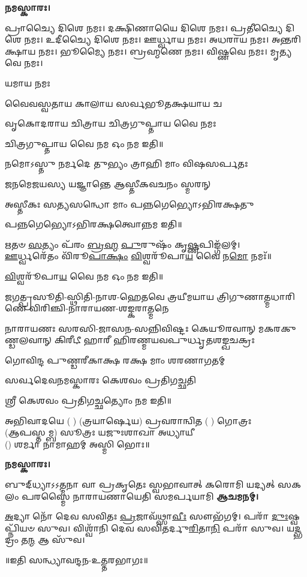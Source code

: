\textbf{𑌨𑌮𑌸𑍍𑌕𑌾𑌰𑌃।}


𑌪𑍍𑌰𑌾𑌚𑍍𑌯𑍈 𑌦𑌿𑌶𑍇 𑌨𑌮𑌃।   
𑌦𑌕𑍍𑌷𑌿𑌣𑌾𑌯𑍈 𑌦𑌿𑌶𑍇 𑌨𑌮𑌃।  
𑌪𑍍𑌰𑌤𑍀𑌚𑍍𑌯𑍈 𑌦𑌿𑌶𑍇 𑌨𑌮𑌃।   
𑌉𑌦𑍀𑌚𑍍𑌯𑍈 𑌦𑌿𑌶𑍇 𑌨𑌮𑌃।   
𑌊𑌰𑍍𑌧𑍍𑌵𑌾𑌯 𑌨𑌮𑌃।   
𑌅𑌧𑌰𑌾𑌯 𑌨𑌮𑌃।   
𑌅𑌨𑍍𑌤𑌰𑌿𑌕𑍍𑌷𑌾𑌯 𑌨𑌮𑌃। 
𑌭𑍂𑌮𑍍𑌯𑍈 𑌨𑌮𑌃। 
𑌬𑍍𑌰𑌹𑍍𑌮𑌣𑍇 𑌨𑌮𑌃। 
𑌵𑌿𑌷𑍍𑌣𑌵𑍇 𑌨𑌮𑌃।  
𑌮𑍃𑌤𑍍𑌯𑌵𑍇 𑌨𑌮𑌃।

𑌯𑌮𑌾𑌯 𑌨𑌮𑌃   

{𑌵𑍈𑌵𑌸𑍍𑌵𑌤𑌾𑌯   𑌕𑌾𑌲𑌾𑌯   𑌸𑌰𑍍𑌵𑌭𑍂𑌤𑌕𑍍𑌷𑌯𑌾𑌯   𑌚}

{𑌵𑍃𑌕𑍋𑌦𑌰𑌾𑌯   𑌚𑌿𑌤𑍍𑌰𑌾𑌯   𑌚𑌿𑌤𑍍𑌰𑌗𑍁𑌪𑍍𑌤𑌾𑌯   𑌵𑍈  𑌨𑌮𑌃}

𑌚𑌿𑌤𑍍𑌰𑌗𑍁𑌪𑍍𑌤𑌾𑌯   𑌵𑍈  𑌨𑌮 𑌓𑌂 𑌨𑌮 𑌇𑌤𑌿॥

 
{𑌨𑌮𑍋𑌽𑌸𑍍𑌤𑍁 𑌨𑌰𑍍𑌮𑌦𑍇 𑌤𑍁𑌭𑍍𑌯𑌂 𑌤𑍍𑌰𑌾𑌹𑌿 𑌮𑌾𑌂 𑌵𑌿𑌷𑌸𑌰𑍍𑌪𑌤𑌃}

{𑌜𑌨𑌮𑍇𑌜𑌯𑌸𑍍𑌯 𑌯𑌜𑍍𑌞𑌾𑌨𑍍𑌤𑍇 𑌆𑌸𑍍𑌤𑍀𑌕𑌵𑌚𑌨𑌂 𑌸𑍍𑌮𑌰𑌨𑍍}


{𑌅𑌸𑍍𑌤𑍀𑌕𑌃 𑌸𑌤𑍍𑌯𑌸𑌨𑍍𑌧𑍋 𑌮𑌾𑌂 𑌪𑌨𑍍𑌨𑌗𑍇𑌭𑍍𑌯𑍋𑌽𑌭𑌿𑌰𑌕𑍍𑌷𑌤𑍁}

𑌪𑌨𑍍𑌨𑌗𑍇𑌭𑍍𑌯𑍋𑌽𑌭𑌿𑌰𑌕𑍍𑌷𑌤𑍍𑌵𑍋𑌨𑍍𑌨𑌮 𑌇𑌤𑌿॥

 

\-\ul{𑌋}\-𑌤𑍞 \ul{𑌸}\-𑌤𑍍𑌯𑌂 𑌪᳴𑌰𑌂 \ul{𑌬𑍍𑌰}\-\-\ul{𑌹𑍍𑌮} \ul{𑌪𑍁}\-𑌰𑍁𑌷𑌂᳴ 𑌕𑍃\-\ul{𑌷𑍍𑌣}\-𑌪𑌿𑌙𑍍𑌗᳴𑌲𑌮𑍍।\\
\-\ul{𑌊}\-𑌰𑍍𑌧𑍍𑌵𑌰𑍇᳴𑌤𑌂 𑌵𑌿᳴𑌰𑍂\-\ul{𑌪𑌾}\-\-\ul{𑌕𑍍𑌷𑌂} \ul{𑌵𑌿}\-𑌶𑍍𑌵𑌰𑍂᳴𑌪𑌾\-\ul{𑌯} 𑌵𑍈 𑌨\-\ul{𑌮𑍋} 𑌨𑌮𑌃᳴॥


\-\ul{𑌵𑌿}\-𑌶𑍍𑌵𑌰𑍂᳴𑌪𑌾\-\ul{𑌯} 𑌵𑍈 𑌨𑌮 𑌓𑌂 𑌨𑌮 𑌇𑌤𑌿॥


{𑌜𑌗𑌤𑍍𑌪𑍍𑌰𑌸𑍂𑌤𑌿-𑌸𑍍𑌥𑌿𑌤𑌿-𑌨𑌾𑌶-𑌹𑍇𑌤𑌵𑍇}
{𑌤𑍍𑌰𑌯𑍀𑌮𑌯𑌾𑌯 𑌤𑍍𑌰𑌿𑌗𑍁𑌣𑌾𑌤𑍍𑌮𑌧𑌾𑌰𑌿𑌣𑍇}
{𑌵𑌿𑌰𑌿𑌞𑍍𑌚𑌿-𑌨𑌾𑌰𑌾𑌯𑌣-𑌶𑌙𑍍𑌕𑌰𑌾𑌤𑍍𑌮𑌨𑍇}

{𑌨𑌾𑌰𑌾𑌯𑌣𑌃 𑌸𑌰𑌸𑌿-𑌜𑌾𑌸𑌨-𑌸𑌨𑍍𑌨𑌿𑌵𑌿𑌷𑍍𑌟𑌃}
{𑌕𑍇𑌯𑍂𑌰𑌵𑌾𑌨𑍍 𑌮𑌕𑌰𑌕𑍁𑌣𑍍𑌡𑌲𑌵𑌾𑌨𑍍 𑌕𑌿𑌰𑍀𑌟𑍀}
{𑌹𑌾𑌰𑍀 𑌹𑌿𑌰𑌣𑍍𑌮𑌯𑌵𑌪𑍁𑌰𑍍𑌧𑍃𑌤𑌶𑌙𑍍𑌖𑌚𑌕𑍍𑌰𑌃}

{𑌗𑍋𑌵𑌿𑌨𑍍𑌦 𑌪𑍁𑌣𑍍𑌡𑌰𑍀𑌕𑌾𑌕𑍍𑌷 𑌰𑌕𑍍𑌷 𑌮𑌾𑌂 𑌶𑌰𑌣𑌾𑌗𑌤𑌮𑍍}

{𑌸𑌰𑍍𑌵𑌦𑍇𑌵𑌨𑌮𑌸𑍍𑌕𑌾𑌰𑌃 𑌕𑍇𑌶𑌵𑌂 𑌪𑍍𑌰𑌤𑌿𑌗𑌚𑍍𑌛𑌤𑌿}

𑌶𑍍𑌰𑍀 𑌕𑍇𑌶𑌵𑌂 𑌪𑍍𑌰𑌤𑌿𑌗𑌚𑍍𑌛𑌤𑍍𑌯𑍋𑌂 𑌨𑌮 𑌇𑌤𑌿॥

𑌅𑌭𑌿𑌵𑌾𑌦𑌯𑍇 ( ) (𑌤𑍍𑌰𑌯𑌾𑌰𑍍𑌷𑍇𑌯) 𑌪𑍍𑌰𑌵𑌰𑌾𑌨𑍍𑌵𑌿𑌤 ( ) 𑌗𑍋𑌤𑍍𑌰𑌃\\
(𑌆𑌪𑌸𑍍𑌤𑌮𑍍𑌬) 𑌸𑍂𑌤𑍍𑌰𑌃 𑌯𑌜𑍁𑌃𑌶𑌾𑌖𑌾 𑌅𑌧𑍍𑌯𑌾𑌯𑍀\\
() 𑌶𑌰𑍍𑌮𑌾 𑌨𑌾𑌮𑌾𑌹𑌮𑍍 𑌅𑌸𑍍𑌮𑌿 𑌭𑍋𑌃॥

\textbf{𑌨𑌮𑌸𑍍𑌕𑌾𑌰𑌃।}


{𑌬𑍁𑌦𑍍‌𑌧𑍍𑌯𑌾𑌽𑌽𑌤𑍍𑌮𑌨𑌾 𑌵𑌾 𑌪𑍍𑌰𑌕𑍃𑌤𑍇𑌃 𑌸𑍍𑌵𑌭𑌾𑌵𑌾𑌤𑍍}
{𑌕𑌰𑍋𑌮𑌿 𑌯𑌦𑍍𑌯𑌤𑍍 𑌸𑌕𑌲𑌂 𑌪𑌰𑌸𑍍𑌮𑍈}
{𑌨𑌾𑌰𑌾𑌯𑌣𑌾𑌯𑍇𑌤𑌿 𑌸𑌮𑌰𑍍𑌪𑌯𑌾𑌮𑌿}
\textbf{𑌆𑌚𑌮𑌨𑌮𑍍।}

\-\ul{𑌅}\-𑌦𑍍𑌯𑌾 𑌨𑍋᳴ 𑌦𑍇𑌵 𑌸𑌵𑌿𑌤𑌃 \ul{𑌪𑍍𑌰}\-𑌜𑌾𑌵᳴𑌥𑍍𑌸𑌾\-\ul{𑌵𑍀𑌃} 𑌸𑍗𑌭᳴𑌗𑌮𑍍। 
𑌪𑌰𑌾᳴ \ul{𑌦𑍁𑌃}\-𑌷𑍍𑌵𑌪𑍍𑌨𑌿᳴𑌯𑍞 𑌸𑍁𑌵। 
𑌵𑌿𑌶𑍍𑌵𑌾᳴𑌨𑌿 𑌦𑍇𑌵 𑌸𑌵𑌿𑌤𑌰𑍍𑌦𑍁\-\ul{𑌰𑌿}\-𑌤𑌾\-\ul{𑌨𑌿} 𑌪𑌰𑌾᳴ 𑌸𑍁𑌵। 
𑌯\-\ul{𑌦𑍍𑌭}\-𑌦𑍍𑌰𑌂 𑌤\-\ul{𑌨𑍍𑌮} 𑌆 𑌸𑍁᳴𑌵।

\centerline{॥𑌇𑌤𑌿 𑌸𑌨𑍍𑌧𑍍𑌯𑌾𑌵𑌨𑍍𑌦𑌨-𑌉𑌤𑍍𑌤𑌰𑌭𑌾𑌗𑌃॥}
